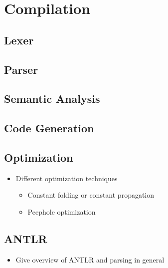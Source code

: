 \section{Compilation}

\subsection{Lexer}

\subsection{Parser}

\subsection{Semantic Analysis}

\subsection{Code Generation}

\subsection{Optimization}
\begin{itemize}
    \item Different optimization techniques
    \begin{itemize}
        \item Constant folding or constant propagation
        \item Peephole optimization
    \end{itemize}
\end{itemize}

\subsection{ANTLR}
\begin{itemize}
    \item Give overview of ANTLR and parsing in general
\end{itemize}